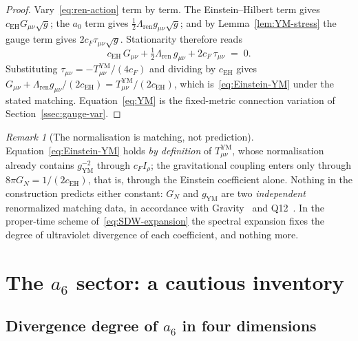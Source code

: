 \documentclass[12pt,a4paper]{article}
\theoremstyle{remark}
\newtheorem{remark}[theorem]{Remark}
\begin{document}
      \begin{proof}
        Vary~\eqref{eq:ren-action} term by term.
        The Einstein--Hilbert term gives $c_{\mathrm{EH}}G_{\mu\nu}\sqrt{g}$;
        the $a_0$ term gives $\tfrac12\Lambda_{\mathrm{ren}}g_{\mu\nu}\sqrt{g}$;
        and by Lemma~\ref{lem:YM-stress} the gauge term gives
        $2c_F\tau_{\mu\nu}\sqrt{g}$.
        Stationarity therefore reads
        \[
          c_{\mathrm{EH}}\,G_{\mu\nu}
          + \tfrac12\Lambda_{\mathrm{ren}}\,g_{\mu\nu}
          + 2c_F\,\tau_{\mu\nu} \;=\; 0 .
        \]
        Substituting $\tau_{\mu\nu} = -T^{\mathrm{YM}}_{\mu\nu}/(4c_F)$ and dividing by
        $c_{\mathrm{EH}}$ gives
        $G_{\mu\nu} + \Lambda_{\mathrm{ren}}g_{\mu\nu}/(2c_{\mathrm{EH}})
         = T^{\mathrm{YM}}_{\mu\nu}/(2c_{\mathrm{EH}})$, which is~\eqref{eq:Einstein-YM}
        under the stated matching.
        Equation~\eqref{eq:YM} is the fixed-metric connection variation of
        Section~\ref{ssec:gauge-var}.
      \end{proof}

      \begin{remark}[The normalisation is matching, not prediction]
        \label{rem:no-prediction}
        Equation~\eqref{eq:Einstein-YM} holds \emph{by definition} of
        $T^{\mathrm{YM}}_{\mu\nu}$, whose normalisation already contains $g_{\mathrm{YM}}^{-2}$
        through $c_F I_\rho$; the gravitational coupling enters only through
        $8\pi G_N = 1/(2c_{\mathrm{EH}})$, that is, through the Einstein coefficient alone.
        Nothing in the construction predicts either constant: $G_N$ and $g_{\mathrm{YM}}$ are two
        \emph{independent} renormalized matching data, in accordance with
        Gravity~\cite{Beau2026h} and Q12~\cite{Beau2026q12}.
        In the proper-time scheme of~\eqref{eq:SDW-expansion} the spectral expansion fixes the
        degree of ultraviolet divergence of each coefficient, and nothing more.
      \end{remark}

  \section{The \texorpdfstring{$a_6$}{a6} sector: a cautious inventory}
    \label{sec:a6}

    \subsection{Divergence degree of \texorpdfstring{$a_6$}{a6} in four dimensions}
      \label{ssec:a6-degree}
\end{document}
